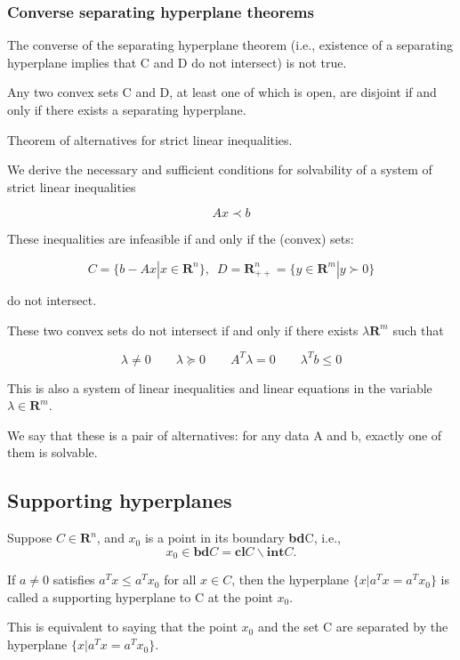 \documentclass{article}
\begin{document}
\subsubsection*{Converse separating hyperplane theorems}

The converse of the separating hyperplane theorem (i.e., existence of a separating
hyperplane implies that C and D do not intersect) is not true.

Any two convex sets C and D, at least one of which is open, are disjoint if and only if there exists a separating hyperplane.

\vspace*{0.3cm}

Theorem of alternatives for strict linear inequalities.

We derive the necessary and sufficient conditions for solvability of a system of strict linear inequalities

\[
Ax\prec b    
\]

These inequalities are infeasible if and only if the (convex) sets:

\[
C=\{b-Ax|x\in \mathbf{R}^n\},\enspace D=\mathbf{R}^n_{++}=\{y\in \mathbf{R}^m|y\succ 0\}
\]

do not intersect.

These two convex sets do not intersect if and only if there exists $\lambda \mathbf{R}^m$ such that 

\[
\lambda\ne0\qquad \lambda \succeq 0\qquad A^T\lambda=0 \qquad \lambda^Tb\le0    
\]

This is also a system of linear inequalities and linear equations in the variable $\lambda \in \mathbf{R}^m$.

We say that these is a pair of alternatives: for any data A and b, exactly one of them is solvable.

\subsection*{Supporting hyperplanes}

Suppose $C \in \mathbf{R}^n$, and $x_0$ is a point in its boundary \textbf{bd}C, i.e.,
\[
    x_0 \in \mathbf{bd}C=\mathbf{cl}C \backslash \mathbf{int}C.
\]

If $a \ne 0$ satisfies $a^T x \le a^T x_0$ for all $x \in C$, then the hyperplane $\{x|a^Tx=a^Tx_0\}$ is called a supporting hyperplane to C at the point $x_0$.

This is equivalent to saying that the point $x_0$ and the set C are separated by the hyperplane $\{x|a^Tx=a^T x_0\}$.
\end{document}
